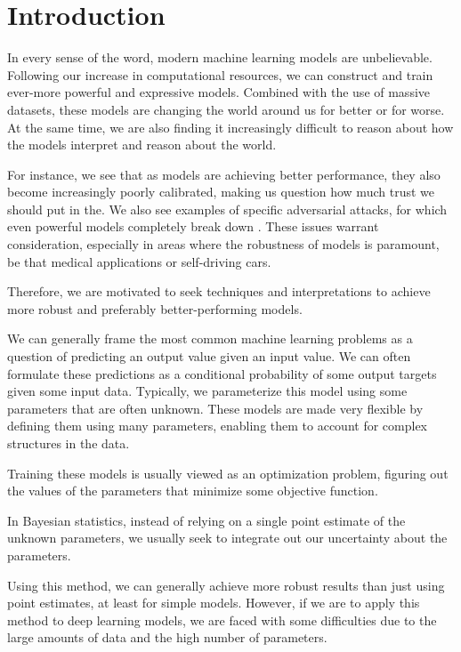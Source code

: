 \chapter{Introduction}
In every sense of the word, modern machine learning models are unbelievable. 
Following our increase in computational resources, we can construct and train ever-more powerful and expressive models.
Combined with the use of massive datasets, these models are changing the world around us for better or for worse. 
At the same time, we are also finding it increasingly difficult to reason about how the models interpret and reason about the world.

For instance, we see that as models are achieving better performance, they also become increasingly poorly calibrated\cite{guo_calibration_2017}, making us question how much trust we should put in the. 
We also see examples of specific adversarial attacks, for which even powerful models completely break down \cite{fezza_perceptual_2019}.
These issues warrant consideration, especially in areas where the robustness of models is paramount, be that medical applications or self-driving cars.

Therefore, we are motivated to seek techniques and interpretations to achieve more robust and preferably better-performing models.

We can generally frame the most common machine learning problems as a question of predicting an output value given an input value. 
We can often formulate these predictions as a conditional probability of some output targets given some input data.
Typically, we parameterize this model using some parameters that are often unknown.
These models are made very flexible by defining them using many parameters, enabling them to account for complex structures in the data. 

Training these models is usually viewed as an optimization problem, figuring out the values of the parameters that minimize some objective function.

In Bayesian statistics, instead of relying on a single point estimate of the unknown parameters, we usually seek to integrate out our uncertainty about the parameters.

Using this method, we can generally achieve more robust results than just using point estimates, at least for simple models.
However, if we are to apply this method to deep learning models, we are faced with some difficulties due to the large amounts of data and the high number of parameters.

